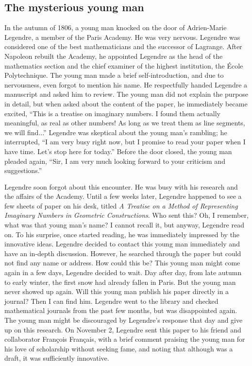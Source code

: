 \documentclass[b5paper]{article}
\begin{document}
\subsection{The mysterious young man}
In the autumn of 1806, a young man knocked on the door of Adrien-Marie Legendre, a member of the Paris Academy. He was very nervous. Legendre was considered one of the best mathematicians and the successor of Lagrange. After Napoleon rebuilt the Academy, he appointed Legendre as the head of the mathematics section and the chief examiner of the highest institution, the École Polytechnique. The young man made a brief self-introduction, and due to nervousness, even forgot to mention his name. He respectfully handed Legendre a manuscript and asked him to review. The young man did not explain the purpose in detail, but when asked about the content of the paper, he immediately became excited, \enquote{This is a treatise on imaginary numbers. I found them actually meaningful, as real as other numbers! As long as we treat them as line segments, we will find...} Legendre was skeptical about the young man's rambling; he interrupted, \enquote{I am very busy right now, but I promise to read your paper when I have time. Let's stop here for today.} Before the door closed, the young man pleaded again, \enquote{Sir, I am very much looking forward to your criticism and suggestions.}

Legendre soon forgot about this encounter. He was busy with his research and the affairs of the Academy. Until a few weeks later, Legendre happened to see a few sheets of paper on his desk, titled \emph{A Treatise on a Method of Representing Imaginary Numbers in Geometric Constructions}. Who sent this? Oh, I remember, what was that young man's name? I cannot recall it, but anyway, Legendre read on. To his surprise, once started reading, he was immediately impressed by the innovative ideas.
Legendre decided to contact this young man immediately and have an in-depth discussion. However, he searched through the paper but could not find any name or address. How could this be? This young man might come again in a few days, Legendre decided to wait. Day after day, from late autumn to early winter, the first snow had already fallen in Paris. But the young man never showed up again. Will this young man publish his paper directly in a journal? Then I can find him. Legendre went to the library and checked mathematical journals from the past few months, but was disappointed again. The young man might be discouraged by Legendre's response that day and give up on this research. On November 2, Legendre sent this paper to his friend and collaborator François Français, with a brief comment praising the young man for his love of scholarship without seeking fame, and noting that although was a draft, it was sufficiently innovative.
\end{document}
